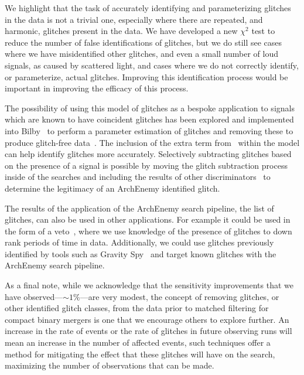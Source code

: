 We highlight that the task of accurately identifying and parameterizing \scl{} glitches in the data is not a trivial one, especially where there are repeated, and harmonic, glitches present in the data. We have developed a new $\chi^{2}$ test to reduce the number of false identifications of \scl{} glitches, but we do still see cases where we have misidentified other glitches, and even a small number of loud \gw{} signals, as caused by scattered light, and cases where we do not correctly identify, or parameterize, actual \scl{} glitches. Improving this identification process would be important in improving the efficacy of this process.

The possibility of using this model of \scl{} glitches as a bespoke application to \gw{} signals which are known to have coincident \scl{} glitches has been explored and implemented into Bilby~\cite{BILBY:2019} to perform a parameter estimation of \scl{} glitches and removing these to produce glitch-free data~\cite{Udall:2023}. The inclusion of the extra term from~\cite{Was_Subtract:2021} within the model can help identify \scl{} glitches more accurately. Selectively subtracting glitches based on the presence of a \gw{} signal is possible by moving the glitch subtraction process inside of the \gw{} searches and including the results of other \gw{} discriminators~\cite{rw_snr_eq:2012, McIsaac_Chi:2022} to determine the legitimacy of an ArchEnemy identified glitch.

The results of the application of the ArchEnemy search pipeline, the list of \scl{} glitches, can also be used in other applications. For example it could be used in the form of a veto~\cite{O2O3_DetChar:2021}, where we use knowledge of the presence of \scl{} glitches to down rank periods of time in \gw{} data. Additionally, we could use \scl{} glitches previously identified by tools such as Gravity Spy~\cite{gravityspy:2023} and target known \scl{} glitches with the ArchEnemy search pipeline.

As a final note, while we acknowledge that the sensitivity improvements that we have observed---$\sim 1\%$---are very modest, the concept of removing \scl{} glitches, or other identified glitch classes, from the data prior to matched filtering for compact binary mergers is one that we encourage others to explore further. An increase in the rate of events or the rate of \scl{} glitches in future observing runs will mean an increase in the number of affected events, such techniques offer a method for mitigating the effect that these glitches will have on the search, maximizing the number of observations that can be made.
%
